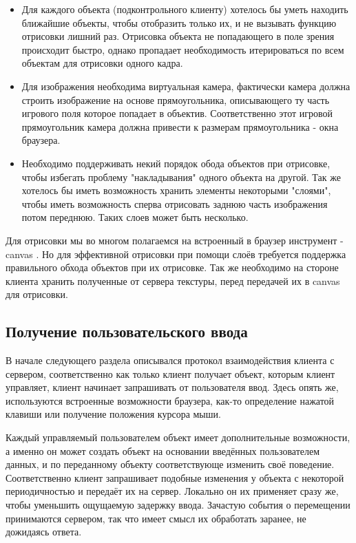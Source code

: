 \documentclass[a4paper,14pt, openany]{book}
\begin{document}
\begin{itemize}
  \item Для каждого объекта (подконтрольного клиенту) хотелось бы уметь находить ближайшие объекты, чтобы отобразить только их, и не вызывать функцию отрисовки лишний раз. Отрисовка объекта не попадающего в поле зрения происходит быстро, однако пропадает необходимость итерироваться по всем объектам для отрисовки одного кадра.
  \item Для изображения необходима виртуальная камера, фактически камера должна строить изображение на основе прямоугольника, описывающего ту часть игрового поля которое попадает в объектив. Соответственно этот игровой прямоугольник камера должна привести к размерам прямоугольника - окна браузера.
  \item Необходимо поддерживать некий порядок обода объектов при отрисовке, чтобы избегать проблему "накладывания" одного объекта на другой. Так же хотелось бы иметь возможность хранить элементы некоторыми "слоями", чтобы иметь возможность сперва отрисовать заднюю часть изображения потом переднюю. Таких слоев может быть несколько.
\end{itemize}

Для отрисовки мы во многом полагаемся на встроенный в браузер инструмент - canvas \cite{canvas}. Но для эффективной отрисовки при помощи слоёв требуется поддержка правильного обхода объектов при их отрисовке. Так же необходимо на стороне клиента хранить полученные от сервера текстуры, перед передачей их в canvas для отрисовки.

\subsection{Получение пользовательского ввода}

В начале следующего раздела описывался протокол взаимодействия клиента с сервером, соответственно как только клиент получает объект, которым клиент управляет, клиент начинает запрашивать от пользователя ввод. Здесь опять же, используются встроенные возможности браузера, как-то определение нажатой клавиши или получение положения курсора мыши. 

Каждый управляемый пользователем объект имеет дополнительные возможности, а именно он может создать объект на основании введённых пользователем данных, и по переданному объекту соответствующе изменить своё поведение. Соответственно клиент запрашивает подобные изменения у объекта с некоторой периодичностью и передаёт их на сервер. Локально он их применяет сразу же, чтобы уменьшить ощущаемую задержку ввода. Зачастую события о перемещении принимаются сервером, так что имеет смысл их обработать заранее, не дожидаясь ответа.
\end{document}
